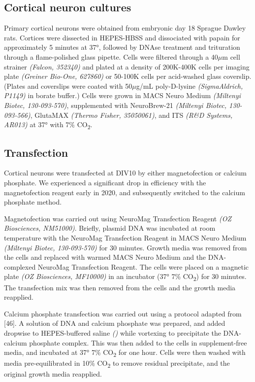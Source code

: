 \documentclass[
  12pt,
  a4paper,
]{book}
\begin{document}
\hypertarget{cortical-neuron-cultures}{%
\subsection{Cortical neuron cultures}\label{cortical-neuron-cultures}}

Primary cortical neurons were obtained from embryonic day 18 Sprague Dawley rats. Cortices were dissected in HEPES-HBSS and dissociated with papain for approximately 5 minutes at 37°, followed by DNAse treatment and trituration through a flame-polished glass pipette. Cells were filtered through a 40\(\mu\)m cell strainer \emph{(Falcon, 352340)} and plated at a density of 200K-400K cells per imaging plate \emph{(Greiner Bio-One, 627860)} or 50-100K cells per acid-washed glass coverslip. (Plates and coverslips were coated with 50\(\mu\)g/mL poly-D-lysine \emph{(SigmaAldrich, P1149)} in borate buffer.) Cells were grown in MACS Neuro Medium \emph{(Miltenyi Biotec, 130-093-570)}, supplemented with NeuroBrew-21 \emph{(Miltenyi Biotec, 130-093-566)}, GlutaMAX \emph{(Thermo Fisher, 35050061)}, and ITS \emph{(R\&D Systems, AR013)} at 37° with 7\% CO\textsubscript{2}.

\hypertarget{transfection}{%
\subsection{Transfection}\label{transfection}}

Cortical neurons were transfected at DIV10 by either magnetofection or calcium phosphate. We experienced a significant drop in efficiency with the magnetofection reagent early in 2020, and subsequently switched to the calcium phosphate method.

Magnetofection was carried out using NeuroMag Transfection Reagent \emph{(OZ Biosciences, NM51000)}. Briefly, plasmid DNA was incubated at room temperature with the NeuroMag Transfection Reagent in MACS Neuro Medium \emph{(Miltenyi Biotec, 130-093-570)} for 30 minutes. Growth media was removed from the cells and replaced with warmed MACS Neuro Medium and the DNA-complexed NeuroMag Transfection Reagent. The cells were placed on a magnetic plate \emph{(OZ Biosciences, MF10000)} in an incubator (37° 7\% CO\textsubscript{2}) for 30 minutes. The transfection mix was then removed from the cells and the growth media reapplied.

Calcium phosphate transfection was carried out using a protocol adapted from {[}46{]}. A solution of DNA and calcium phosphate was prepared, and added dropwise to HEPES-buffered saline \emph{()} while vortexing to precipitate the DNA-calcium phosphate complex. This was then added to the cells in supplement-free media, and incubated at 37° 7\% CO\textsubscript{2} for one hour. Cells were then washed with media pre-equilibrated in 10\% CO\textsubscript{2} to remove residual precipitate, and the original growth media reapplied.
\end{document}
